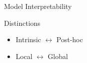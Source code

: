 \documentclass[ignorenonframetext,xcolor=x11names]{beamer}
\begin{document}
\begin{frame}{Model Interpretability}
\begin{block}{Distinctions}
\begin{itemize}
   \item Intrinsic $\leftrightarrow$ Post-hoc
   \item Local $\leftrightarrow$ Global
\end{itemize}
\end{block}
\end{frame}

\end{document}
